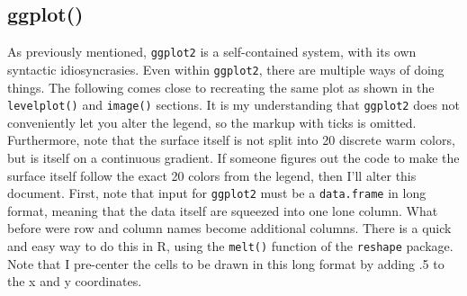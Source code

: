 \documentclass[a4paper]{article}
\begin{document}
\subsection{ggplot()}
As previously mentioned, \texttt{ggplot2} is a self-contained system, with its own syntactic idiosyncrasies. Even within \texttt{ggplot2}, there are multiple ways of doing things. The following comes close to recreating the same plot as shown in the \texttt{levelplot()} and \texttt{image()} sections. It is my understanding that \texttt{ggplot2} does not conveniently let you alter the legend, so the markup with ticks is omitted. Furthermore, note that the surface itself is not split into 20 discrete warm colors, but is itself on a continuous gradient. If someone figures out the code to make the surface itself follow the exact 20 colors from the legend, then I'll alter this document. First, note that input for \texttt{ggplot2} must be a \texttt{data.frame} in long format, meaning that the data itself are squeezed into one lone column. What before were row and column names become additional columns. There is a quick and easy way to do this in R, using the \texttt{melt()} function of the \texttt{reshape} package. Note that I pre-center the cells to be drawn in this long format by adding .5 to the x and y coordinates.

\end{document}
